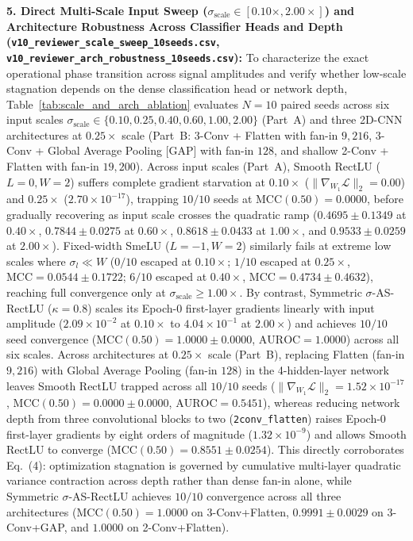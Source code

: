 \documentclass[11pt, a4paper]{article}
\begin{document}
\noindent\textbf{5. Direct Multi-Scale Input Sweep ($\sigma_{\mathrm{scale}} \in [0.10\times, 2.00\times]$) and Architecture Robustness Across Classifier Heads and Depth (\texttt{v10\_reviewer\_scale\_sweep\_10seeds.csv}, \texttt{v10\_reviewer\_arch\_robustness\_10seeds.csv}):} To characterize the exact operational phase transition across signal amplitudes and verify whether low-scale stagnation depends on the dense classification head or network depth, Table~\ref{tab:scale_and_arch_ablation} evaluates $N=10$ paired seeds across six input scales $\sigma_{\mathrm{scale}} \in \{0.10, 0.25, 0.40, 0.60, 1.00, 2.00\}$ (Part~A) and three 2D-CNN architectures at $0.25\times$ scale (Part~B: 3-Conv + Flatten with fan-in $9{,}216$, 3-Conv + Global Average Pooling [GAP] with fan-in $128$, and shallow 2-Conv + Flatten with fan-in $19{,}200$). Across input scales (Part~A), Smooth RectLU ($L=0, W=2$) suffers complete gradient starvation at $0.10\times$ ($\|\nabla_{W_1}\mathcal{L}\|_2 = 0.00$) and $0.25\times$ ($2.70\times 10^{-17}$), trapping $10/10$ seeds at $\mathrm{MCC}(0.50)=0.0000$, before gradually recovering as input scale crosses the quadratic ramp ($0.4695 \pm 0.1349$ at $0.40\times$, $0.7844 \pm 0.0275$ at $0.60\times$, $0.8618 \pm 0.0433$ at $1.00\times$, and $0.9533 \pm 0.0259$ at $2.00\times$). Fixed-width SmeLU ($L=-1, W=2$) similarly fails at extreme low scales where $\sigma_l \ll W$ ($0/10$ escaped at $0.10\times$; $1/10$ escaped at $0.25\times$, $\mathrm{MCC}=0.0544 \pm 0.1722$; $6/10$ escaped at $0.40\times$, $\mathrm{MCC}=0.4734 \pm 0.4632$), reaching full convergence only at $\sigma_{\mathrm{scale}} \ge 1.00\times$. By contrast, Symmetric $\sigma$-AS-RectLU ($\kappa=0.8$) scales its Epoch-0 first-layer gradients linearly with input amplitude ($2.09\times 10^{-2}$ at $0.10\times$ to $4.04\times 10^{-1}$ at $2.00\times$) and achieves $10/10$ seed convergence ($\mathrm{MCC}(0.50)=1.0000 \pm 0.0000$, $\mathrm{AUROC}=1.0000$) across all six scales. Across architectures at $0.25\times$ scale (Part~B), replacing Flatten (fan-in $9{,}216$) with Global Average Pooling (fan-in $128$) in the 4-hidden-layer network leaves Smooth RectLU trapped across all $10/10$ seeds ($\|\nabla_{W_1}\mathcal{L}\|_2 = 1.52\times 10^{-17}$, $\mathrm{MCC}(0.50)=0.0000 \pm 0.0000$, $\mathrm{AUROC}=0.5451$), whereas reducing network depth from three convolutional blocks to two (\texttt{2conv\_flatten}) raises Epoch-0 first-layer gradients by eight orders of magnitude ($1.32\times 10^{-9}$) and allows Smooth RectLU to converge ($\mathrm{MCC}(0.50)=0.8551 \pm 0.0254$). This directly corroborates Eq.~(4): optimization stagnation is governed by cumulative multi-layer quadratic variance contraction across depth rather than dense fan-in alone, while Symmetric $\sigma$-AS-RectLU achieves $10/10$ convergence across all three architectures ($\mathrm{MCC}(0.50) = 1.0000$ on 3-Conv+Flatten, $0.9991 \pm 0.0029$ on 3-Conv+GAP, and $1.0000$ on 2-Conv+Flatten).
\end{document}
